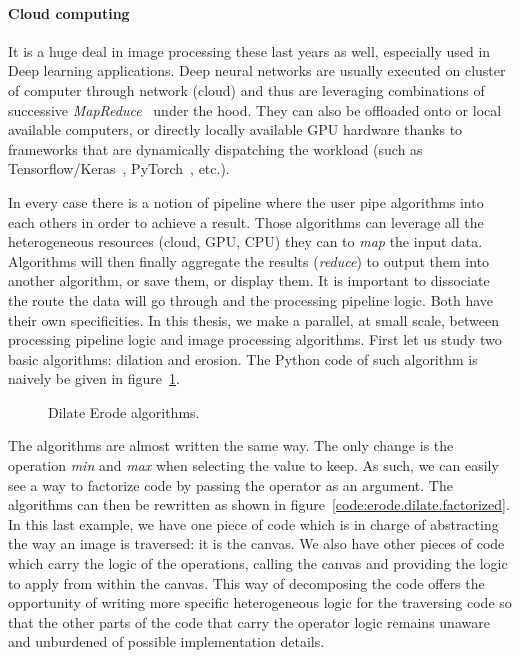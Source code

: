 \paragraph{Cloud computing} It is a huge deal in image processing these last years as well, especially used in Deep
learning applications. Deep neural networks are usually executed on cluster of computer through network (cloud) and thus
are leveraging combinations of successive \emph{MapReduce}~\parencite{dean.2008.mapreduce} under the hood. They can also
be offloaded onto or local available computers, or directly locally available GPU hardware thanks to frameworks that are
dynamically dispatching the workload (such as
Tensorflow/Keras~\parencite{tensorflow.2015.whitepaper,chollet.2015.keras,gulli.2017.deep},
PyTorch~\parencite{paszke.2019.pytorch}, etc.).

In every case there is a notion of pipeline where the user pipe algorithms into each others in order to achieve a
result. Those algorithms can leverage all the heterogeneous resources (cloud, GPU, CPU) they can to \emph{map} the input
data. Algorithms will then finally aggregate the results (\emph{reduce}) to output them into another algorithm, or save
them, or display them. It is important to dissociate the route the data will go through and the processing pipeline
logic. Both have their own specificities. In this thesis, we make a parallel, at small scale, between processing
pipeline logic and image processing algorithms. First let us study two basic algorithms: dilation and erosion. The
Python code of such algorithm is naively be given in figure~\ref{code:erode.dilate}.

\begin{figure}[htbp]
  \centering
  \hfil
  \caption{Dilate \vs Erode algorithms.}
  \label{code:erode.dilate}
\end{figure}

The algorithms are almost written the same way. The only change is the operation \emph{min} and \emph{max} when
selecting the value to keep. As such, we can easily see a way to factorize code by passing the operator as an argument.
The algorithms can then be rewritten as shown in figure~\ref{code:erode.dilate.factorized}. In this last example, we
have one piece of code which is in charge of abstracting the way an image is traversed: it is the canvas. We also have
other pieces of code which carry the logic of the operations, calling the canvas and providing the logic to apply from
within the canvas. This way of decomposing the code offers the opportunity of writing more specific heterogeneous logic
for the traversing code so that the other parts of the code that carry the operator logic remains unaware and unburdened
of possible implementation details.

